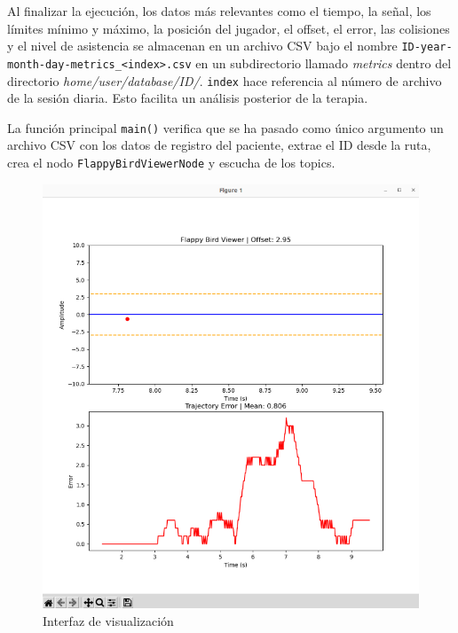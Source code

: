 Al finalizar la ejecución, los datos más relevantes como el tiempo, la señal, los límites mínimo y máximo, la posición del jugador, el offset, el error, las colisiones y el nivel de asistencia se almacenan en un archivo CSV bajo el nombre \verb|ID-year-month-day-metrics_<index>.csv| en un subdirectorio llamado \textit{metrics} dentro del directorio \textit{home/user/database/ID/}.
\verb|index| hace referencia al número de archivo de la sesión diaria.
Esto facilita un análisis posterior de la terapia.

La función principal \verb|main()| verifica que se ha pasado como único argumento un archivo CSV con los datos de registro del paciente, extrae el ID desde la ruta, crea el nodo \verb|FlappyBirdViewerNode| y escucha de los topics.

\begin{figure}[ht!]
	\centering
	\begin{minipage}{0.85\linewidth}
		\centering
		\includegraphics[width=\linewidth]{figs/visual.png}
	\end{minipage}
	\caption[Interfaz de visualización]{Interfaz de visualización}
	\label{fig:visual}
\end{figure}

